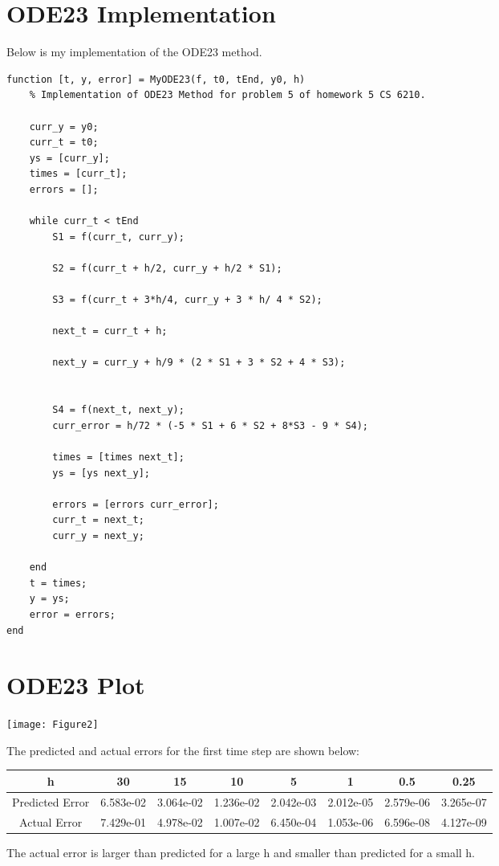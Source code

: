 \documentclass{article}
\begin{document}
\section{ODE23 Implementation}
Below is my implementation of the ODE23 method.
\begin{verbatim}
function [t, y, error] = MyODE23(f, t0, tEnd, y0, h)
    % Implementation of ODE23 Method for problem 5 of homework 5 CS 6210. 
    
    curr_y = y0;
    curr_t = t0;
    ys = [curr_y];
    times = [curr_t];
    errors = [];
    
    while curr_t < tEnd
        S1 = f(curr_t, curr_y);

        S2 = f(curr_t + h/2, curr_y + h/2 * S1);

        S3 = f(curr_t + 3*h/4, curr_y + 3 * h/ 4 * S2);

        next_t = curr_t + h;

        next_y = curr_y + h/9 * (2 * S1 + 3 * S2 + 4 * S3);


        S4 = f(next_t, next_y);
        curr_error = h/72 * (-5 * S1 + 6 * S2 + 8*S3 - 9 * S4);

        times = [times next_t];
        ys = [ys next_y];

        errors = [errors curr_error];
        curr_t = next_t;
        curr_y = next_y;

    end
    t = times;
    y = ys;
    error = errors;
end
\end{verbatim}

\section{ODE23 Plot}

\texttt{[image: Figure2]}

The predicted and actual errors for the first time step are shown below:

\begin{center}
\begin{tabular}{c|c|c|c|c|c|c|c}
 h &  30& 15& 10& 5& 1& 0.5& 0.25\\ \hline
Predicted Error & 6.583e-02& 3.064e-02& 1.236e-02& 2.042e-03& 2.012e-05& 2.579e-06& 3.265e-07\\
Actual Error &7.429e-01& 4.978e-02& 1.007e-02& 6.450e-04& 1.053e-06& 6.596e-08& 4.127e-09
\end{tabular}
\end{center}

The actual error is larger than predicted for a large h and smaller than predicted for a small h.
\end{document}
